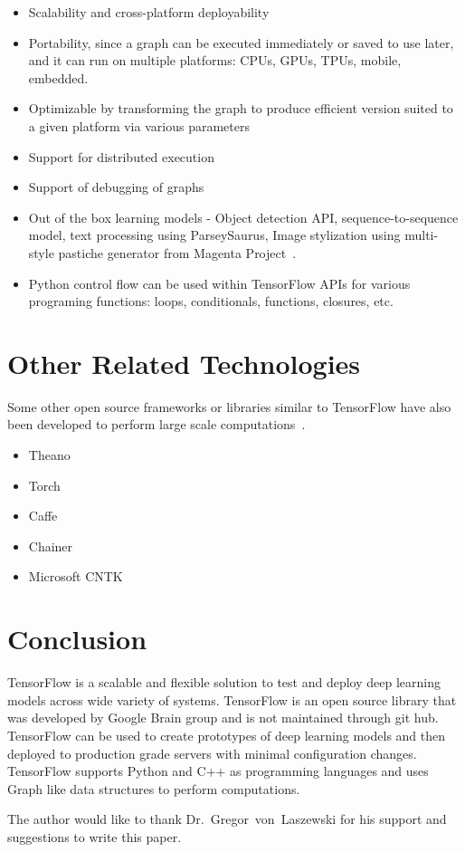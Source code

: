 \begin{itemize}
  \item Scalability and cross-platform deployability
  \item Portability, since a graph can be executed immediately or saved to use later, 
  and it can run on multiple platforms: CPUs, GPUs, TPUs, mobile, embedded.
  \item Optimizable by transforming the graph to produce efficient 
  version suited to a given platform via various parameters
  \item Support for distributed execution
  \item Support of debugging of graphs
  \item Out of the box learning models - Object detection API,
sequence-to-sequence model, text processing using ParseySaurus, Image
stylization using multi-style pastiche generator from Magenta
Project~\cite{hid-sp18-510-tfblog}.
  \item Python control flow can be used within TensorFlow APIs
  for various programing functions: loops, conditionals, functions,
  closures, etc.
\end{itemize}

\section{Other Related Technologies}
Some other open source frameworks or libraries similar to TensorFlow
have also been developed to perform large scale
computations~\cite{hid-sp18-510-tensorflow2015-whitepaper}.
\begin{itemize}
	\item Theano~\cite{hid-sp18-510-web-theano} 
	\item Torch~\cite{hid-sp18-510-web-torch}
	\item Caffe~\cite{hid-sp18-510-web-caffe}
	\item Chainer~\cite{hid-sp18-510-web-chain}
	\item Microsoft CNTK~\cite{hid-sp18-510-web-cntk}
\end{itemize}	

\section{Conclusion}

TensorFlow is a scalable and flexible solution to test and deploy deep learning models 
across wide variety of systems. TensorFlow is an open source library that was developed by 
Google Brain group and is not maintained through git hub. TensorFlow can be used to create
prototypes of deep learning models and then deployed to production grade servers with 
minimal configuration changes. TensorFlow supports Python and C++ as programming languages
and uses Graph like data structures to perform computations.

\begin{acks}

  The author would like to thank Dr.~Gregor~von~Laszewski for his
  support and suggestions to write this paper.

\end{acks}


 


